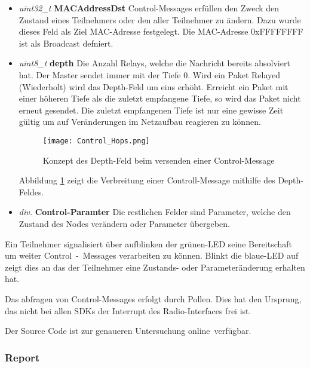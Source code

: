 \begin{itemize}
	\item \textit{uint32\_t} \textbf{MACAddressDst} Control-Messages erfüllen den Zweck den Zustand eines Teilnehmers oder den aller Teilnehmer zu ändern. Dazu wurde dieses Feld als Ziel MAC-Adresse festgelegt. Die MAC-Adresse 0xFFFFFFFF ist als Broadcast defniert.
	
	\item \textit{uint8\_t} \textbf{depth} Die Anzahl Relays, welche die Nachricht bereits absolviert hat. Der Master sendet immer mit der Tiefe 0. Wird ein Paket Relayed (Wiederholt) wird das Depth-Feld um eins erhöht. Erreicht ein Paket mit einer höheren Tiefe als die zuletzt empfangene Tiefe, so wird das Paket nicht erneut gesendet. Die zuletzt empfangenen Tiefe ist nur eine gewisse Zeit gültig um auf Veränderungen im Netzaufbau reagieren zu können.
	
	
	\begin{figure}[H]
		\centering
		\texttt{[image: Control\_Hops.png]}
		\caption{Konzept des Depth-Feld beim versenden einer Control-Message}\label{fig:ControlMessagesHops}
	\end{figure}

	Abbildung \ref{fig:ControlMessagesHops} zeigt die Verbreitung einer Controll-Message mithilfe des Depth-Feldes. \\
	
	\item \textit{div.} \textbf{Control-Paramter} Die restlichen Felder sind Parameter, welche den Zustand des Nodes verändern oder Parameter übergeben. 
\end{itemize}


Ein Teilnehmer signalisiert über aufblinken der grünen-LED seine Bereitschaft um weiter Control~-~Messages verarbeiten zu können. Blinkt die blaue-LED auf zeigt dies an das der Teilnehmer eine Zustands- oder Parameteränderung erhalten hat. 

Das abfragen von Control-Messages erfolgt durch Pollen. Dies hat den Ursprung, das nicht bei allen SDKs der Interrupt des Radio-Interfaces frei ist.


Der Source Code ist zur genaueren Untersuchung online\footnotemark\ verfügbar. 


\subsubsection{Report}\label{subsubsec:Report}

